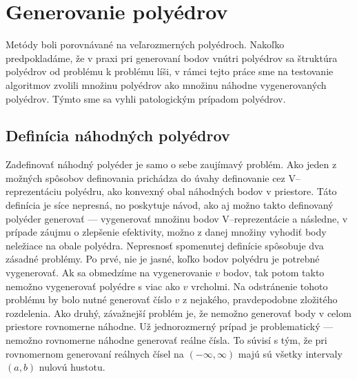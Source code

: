 \section{Generovanie polyédrov}
Metódy boli porovnávané na veľarozmerných polyédroch.
Nakoľko predpokladáme, že v praxi pri generovaní bodov vnútri polyédrov sa štruktúra polyédrov od problému k problému líši, v rámci tejto práce sme na testovanie algoritmov zvolili množinu polyédrov ako množinu náhodne vygenerovaných polyédrov.
Týmto sme sa vyhli patologickým prípadom polyédrov.

\subsection{Definícia náhodných polyédrov}
Zadefinovať náhodný polyéder je samo o sebe zaujímavý problém. Ako jeden z možných spôsobov definovania prichádza do úvahy definovanie cez V--reprezentáciu polyédru, ako konvexný obal náhodných bodov v priestore. Táto definícia je síce nepresná, no poskytuje návod, ako aj možno takto definovaný polyéder generovať --- vygenerovať množinu bodov V--reprezentácie a následne, v prípade záujmu o zlepšenie efektivity, možno z danej množiny vyhodiť body neležiace na obale polyédra. Nepresnosť spomenutej definície spôsobuje dva zásadné problémy.
Po prvé, nie je jasné, koľko bodov polyédru je potrebné vygenerovať. Ak sa obmedzíme na vygenerovanie $v$ bodov, tak potom takto nemožno vygenerovať polyédre s viac ako $v$ vrcholmi. Na odstránenie tohoto problému by bolo nutné generovať číslo $v$ z nejakého, pravdepodobne zložitého rozdelenia. 
Ako druhý, závažnejší problém je, že nemožno generovať body v celom priestore rovnomerne náhodne. Už jednorozmerný prípad je problematický --- nemožno rovnomerne náhodne generovať reálne čísla. To súvisí s tým, že pri rovnomernom generovaní reálnych čísel na $(-\infty, \infty)$ majú sú všetky intervaly $(a,b)$ nulovú hustotu.\\

